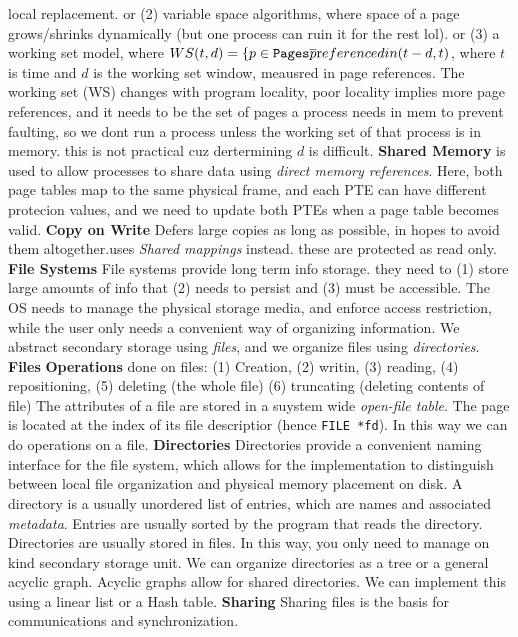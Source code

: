 local replacement. or (2) variable space algorithms, where space of a page
grows/shrinks dynamically (but one process can ruin it for the rest lol). or
(3) a working set model, where $WS(t,d) = \{ p \in {\tt Pages} \bar p {\text
referenced in } (t-d, t)$, where $t$ is time and $d$ is the working set window,
meausred in page references. The working set (WS) changes with program
locality, poor locality implies more page references, and it needs to be the
set of pages a process needs in mem to prevent faulting, so we dont run a
process unless the working set of that process is in memory. this is not
practical cuz dertermining $d$ is difficult.  {\bf Shared Memory} is used to
allow processes to share data using \emph{direct memory references}.  Here,
both page tables map to the same physical frame, and each PTE can have
different protecion values, and we need to update both PTEs when a page table
becomes valid.
{\bf Copy on Write}
Defers large copies as long as possible, in hopes to avoid them
altogether.uses   \emph{Shared mappings} instead. these are protected as read only.
{\bf File Systems}
File systems provide long term info storage. they need to (1) store large amounts of info that (2) needs to persist and (3) must be accessible.
The OS needs to manage the physical storage media, and enforce access
restriction, while the user only needs a convenient way of organizing
information.
We abstract secondary storage using \emph{files}, and we organize files
using \emph{directories}.
{\bf Files}
{\bf Operations } done on files: (1) Creation, (2) writin, (3) reading, (4) repositioning, (5) deleting (the whole file) (6) truncating (deleting contents of file)
The attributes of a file are stored in a suystem wide \emph{open-file
table}. The page is located at the index of its file descriptior (hence
\texttt{FILE\ *fd}). In this way we can do operations on a file.
{\bf Directories}
Directories provide a convenient naming interface for the file system,
which allows for the implementation to distinguish between local file
organization and physical memory placement on disk.
A directory is a usually unordered list of entries, which are names and
associated \emph{metadata}. Entries are usually sorted by the program
that reads the directory.
Directories are usually stored in files. In this way, you only need to
manage on kind secondary storage unit.
We can organize directories as a tree or a general acyclic graph.
Acyclic graphs allow for shared directories. We can implement this using
a linear list or a Hash table.
{\bf Sharing}
Sharing files is the basis for communications and synchronization.
